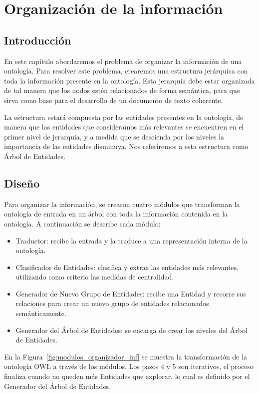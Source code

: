 \chapter{Organización de la información}

\section{Introducción}
En este capítulo abordaremos el problema de organizar la información de una ontología. Para resolver este problema, crearemos una estructura jerárquica con toda la información presente en la ontología. Esta jerarquía debe estar organizada de tal manera que los nodos estén relacionados de forma semántica, para que sirva como base para el desarrollo de un documento de texto coherente. 

La estructura estará compuesta por las entidades presentes en la ontología, de manera que las entidades que consideramos más relevantes se encuentren en el primer nivel de jerarquía, y a medida que se descienda por los niveles la importancia de las entidades disminuya. Nos referiremos a esta estructura como Árbol de Entidades.

\section{Diseño}
Para organizar la información, se crearon cuatro módulos que transforman la ontología de entrada en un árbol con toda la información contenida en la ontología. A continuación se describe cada módulo:
\begin{itemize}
    \item Traductor: recibe la entrada y la traduce a una representación interna de la ontología.
    \item Clasificador de Entidades: clasifica y extrae las entidades más relevantes, utilizando como criterio las medidas de centralidad.
    \item Generador de Nuevo Grupo de Entidades: recibe una Entidad y recorre sus relaciones para crear un nuevo grupo de entidades relacionados semánticamente.
    \item Generador del Árbol de Entidades: se encarga de crear los niveles del Árbol de Entidades. 
\end{itemize}

En la Figura~\ref{fig:modulos_organizador_inf} se muestra la transformación de la ontología OWL a través de los módulos. Los pasos 4 y 5 son iterativos, el proceso finaliza cuando no queden más Entidades que explorar, lo cual es definido por el Generador del Árbol de Entidades.

